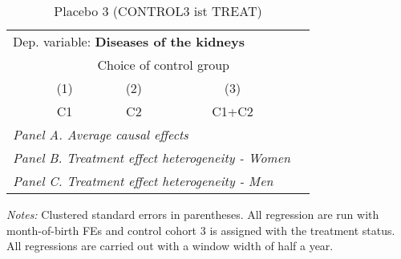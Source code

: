  \begin{table}[H] \centering \begin{threeparttable} \caption{Placebo 3 (CONTROL3 ist TREAT) } {\def\sym#1{\ifmmode^{#1}\else\(^{#1}\)\fi} \begin{tabular}{l*{4}{c}} \toprule \multicolumn{4}{l}{Dep. variable: \textbf{Diseases of the kidneys}} \\ & \multicolumn{3}{c}{Choice of control group} \\ \cmidrule(lr){2-4}
            &\multicolumn{1}{c}{(1)}&\multicolumn{1}{c}{(2)}&\multicolumn{1}{c}{(3)}\\
            &\multicolumn{1}{c}{C1}&\multicolumn{1}{c}{C2}&\multicolumn{1}{c}{C1+C2}\\
\midrule
 \multicolumn{4}{l}{\emph{Panel A. Average causal effects}} \\      \midrule\multicolumn{4}{l}{\emph{Panel B. Treatment effect heterogeneity - Women}} \\      \midrule\multicolumn{4}{l}{\emph{Panel C. Treatment effect heterogeneity - Men}} \\      
\bottomrule \end{tabular} } \begin{tablenotes} \item \scriptsize \emph{Notes:} Clustered standard errors in parentheses. All regression are run with month-of-birth FEs and control cohort 3 is assigned with the treatment status. All regressions are carried out with a window width of half a year. \end{tablenotes} \end{threeparttable} \end{table} 
